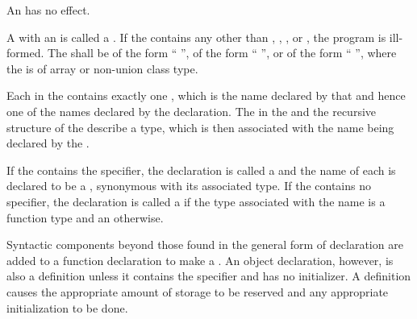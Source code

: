 \pnum
An  has no effect.

\pnum
A  with an  is called
a .
If the  contains
any  other than
, , , or
,
the program is ill-formed.
The  shall be
of the form ``\tcode{=} '',
of the form ``\tcode{\{}  \tcode{\}}'',
or
of the form ``\tcode{(}  \tcode{)}'',
where the
 is of array or non-union class type.

\pnum
Each  in the 
contains exactly one , which is the name
declared by that  and hence one of the names
declared by the declaration. The
 in the
 and the recursive 
structure of the  describe a
type, which is then associated with the name being
declared by the .

\pnum
If the  contains the 
specifier, the declaration is called a  and the name
of each 
is declared to be a , synonymous with its
associated type. If the
 contains no  specifier, the
declaration is called a  if
the type associated with the name is a function type and
an  otherwise.

\pnum
{}%
Syntactic components beyond those found in the general form of
declaration are added to a function declaration to make a
. An object declaration, however, is also
a definition unless it contains the  specifier and has no
initializer.
%
A
definition causes the appropriate amount of storage to be reserved and
any appropriate initialization to be done.

